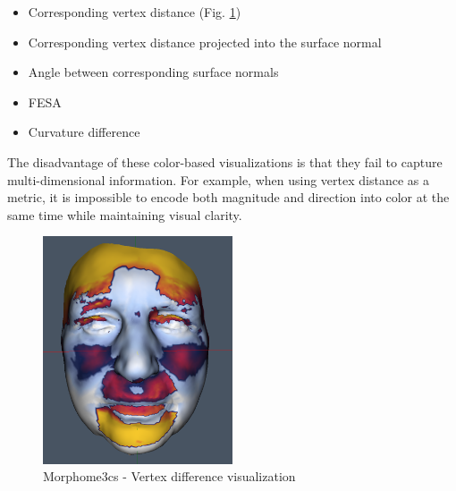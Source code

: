 \begin{itemize}
\item Corresponding vertex distance (Fig. \ref{fig:morpho_example})
\item Corresponding vertex distance projected into the surface normal
\item Angle between corresponding surface normals
\item FESA\footnotemark
\item Curvature difference
\end{itemize}


The disadvantage of these color-based visualizations is that they fail to capture multi-dimensional information. For example, when using vertex distance as a metric, it is impossible to encode both magnitude and direction into color at the same time while maintaining visual clarity.

\begin{figure}[h]
\centering
\includegraphics[width=0.5\textwidth]{./img/morpho-example01.PNG}
\caption{Morphome3cs - Vertex difference visualization}
\label{fig:morpho_example}
\end{figure}

